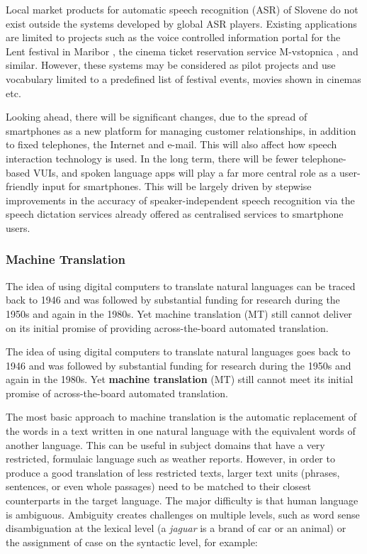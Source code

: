 \begin{multicols}{2}
Local market products for automatic speech recognition (ASR) of Slovene do not exist outside the systems developed by global ASR players. Existing applications are limited to projects such as the voice controlled information portal for the Lent festival in Maribor \cite{Lent1},  the cinema ticket reservation service M-vstopnica \cite{Kolosej1},  and similar. However, these systems may be considered as pilot projects and use vocabulary limited to a predefined list of festival events, movies shown in cinemas etc.

Looking ahead, there will be significant changes, due to the spread of smartphones as a new platform for managing customer relationships, in addition to fixed telephones, the Internet and e-mail. This will also affect how speech interaction technology is used. In the long term, there will be fewer telephone-based VUIs, and spoken language apps will play a far more central role as a user-friendly input for smartphones. This will be largely driven by stepwise improvements in the accuracy of speaker-independent speech recognition via the speech dictation services already offered as centralised services to smartphone users.

\subsubsection{Machine Translation}

The idea of using digital computers to translate natural languages can be traced back to 1946 and was followed by substantial funding for research during the 1950s and again in the 1980s. 
Yet machine translation (MT) still cannot deliver on its initial promise of providing across-the-board automated translation.  

The idea of using digital computers to translate natural languages goes back to 1946 and was followed by substantial funding for research during the 1950s and again in the 1980s. Yet \textbf{machine translation} (MT) still cannot meet its initial promise of across-the-board automated translation. 


The most basic approach to machine translation is the automatic replacement of the words in a text written in one natural language with the equivalent words of another language. This can be useful in subject domains that have a very restricted, formulaic language such as weather reports.
However, in order to produce a good translation of less restricted texts, larger text units (phrases, sentences, or even whole passages) need to be matched to their closest counterparts in the target language. The major difficulty is that human language is ambiguous. Ambiguity creates challenges on multiple levels, such as word sense disambiguation at the lexical level (a \textit{jaguar} is a brand of car or an animal) or the assignment of case on the syntactic level, for example:


\end{multicols}
